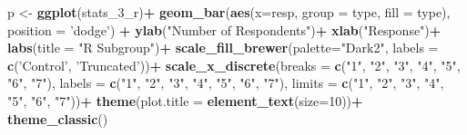 \documentclass[
]{article}
\newenvironment{Shaded}{\begin{snugshade}}{\end{snugshade}}
\newcommand{\DataTypeTok}[1]{\textcolor[rgb]{0.13,0.29,0.53}{#1}}
\newcommand{\DecValTok}[1]{\textcolor[rgb]{0.00,0.00,0.81}{#1}}
\newcommand{\KeywordTok}[1]{\textcolor[rgb]{0.13,0.29,0.53}{\textbf{#1}}}
\newcommand{\NormalTok}[1]{#1}
\newcommand{\OperatorTok}[1]{\textcolor[rgb]{0.81,0.36,0.00}{\textbf{#1}}}
\newcommand{\StringTok}[1]{\textcolor[rgb]{0.31,0.60,0.02}{#1}}
\begin{document}
\begin{Shaded}
\begin{Highlighting}[]
\NormalTok{p <-}\StringTok{ }\KeywordTok{ggplot}\NormalTok{(stats_}\DecValTok{3}\NormalTok{_r)}\OperatorTok{+}
\StringTok{  }\KeywordTok{geom_bar}\NormalTok{(}\KeywordTok{aes}\NormalTok{(}\DataTypeTok{x=}\NormalTok{resp, }\DataTypeTok{group =}\NormalTok{ type, }\DataTypeTok{fill =}\NormalTok{ type), }\DataTypeTok{position =} \StringTok{'dodge'}\NormalTok{) }\OperatorTok{+}
\StringTok{  }\KeywordTok{ylab}\NormalTok{(}\StringTok{"Number of Respondents"}\NormalTok{)}\OperatorTok{+}
\StringTok{  }\KeywordTok{xlab}\NormalTok{(}\StringTok{"Response"}\NormalTok{)}\OperatorTok{+}
\StringTok{  }\KeywordTok{labs}\NormalTok{(}\DataTypeTok{title =} \StringTok{"R Subgroup"}\NormalTok{)}\OperatorTok{+}
\StringTok{  }\KeywordTok{scale_fill_brewer}\NormalTok{(}\DataTypeTok{palette=}\StringTok{"Dark2"}\NormalTok{, }\DataTypeTok{labels =} \KeywordTok{c}\NormalTok{(}\StringTok{'Control'}\NormalTok{, }\StringTok{'Truncated'}\NormalTok{))}\OperatorTok{+}
\StringTok{  }\KeywordTok{scale_x_discrete}\NormalTok{(}\DataTypeTok{breaks =} \KeywordTok{c}\NormalTok{(}\StringTok{"1"}\NormalTok{, }\StringTok{"2"}\NormalTok{, }\StringTok{"3"}\NormalTok{, }\StringTok{"4"}\NormalTok{, }\StringTok{"5"}\NormalTok{, }\StringTok{"6"}\NormalTok{, }\StringTok{"7"}\NormalTok{), }\DataTypeTok{labels =} \KeywordTok{c}\NormalTok{(}\StringTok{"1"}\NormalTok{, }\StringTok{"2"}\NormalTok{, }\StringTok{"3"}\NormalTok{, }\StringTok{"4"}\NormalTok{, }\StringTok{"5"}\NormalTok{, }\StringTok{"6"}\NormalTok{, }\StringTok{"7"}\NormalTok{), }\DataTypeTok{limits =} \KeywordTok{c}\NormalTok{(}\StringTok{"1"}\NormalTok{, }\StringTok{"2"}\NormalTok{, }\StringTok{"3"}\NormalTok{, }\StringTok{"4"}\NormalTok{, }\StringTok{"5"}\NormalTok{, }\StringTok{"6"}\NormalTok{, }\StringTok{"7"}\NormalTok{))}\OperatorTok{+}
\StringTok{  }\KeywordTok{theme}\NormalTok{(}\DataTypeTok{plot.title =} \KeywordTok{element_text}\NormalTok{(}\DataTypeTok{size=}\DecValTok{10}\NormalTok{))}\OperatorTok{+}
\StringTok{  }\KeywordTok{theme_classic}\NormalTok{()}


\end{Highlighting}
\end{Shaded}
\end{document}
